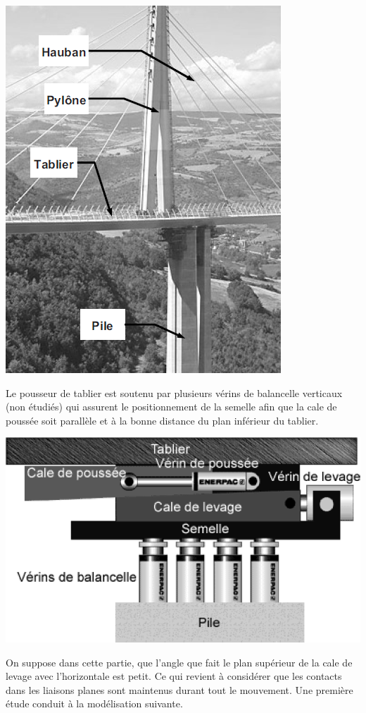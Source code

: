 \documentclass[10pt,fleqn]{article} %
\begin{document}
\begin{multicols}{2}
\begin{center}
\includegraphics[width=.6\linewidth]{images/viaduc_01.png}
\end{center}

Le pousseur de tablier est soutenu par plusieurs vérins de balancelle verticaux (non étudiés) qui assurent le positionnement de la semelle afin que la cale de poussée soit parallèle et à la bonne distance du plan inférieur du tablier. 
\begin{center}
\includegraphics[width=\linewidth]{images/viaduc_02.png}
\end{center}

On suppose dans cette partie, que l’angle que fait le plan supérieur de la cale de levage avec
l’horizontale est petit. Ce qui revient à considérer que les contacts dans les liaisons planes sont
maintenus durant tout le mouvement.
Une première étude conduit à la modélisation suivante.


\end{multicols}
\end{document}
